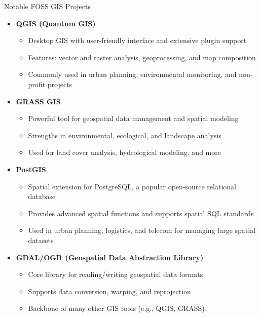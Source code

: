 \documentclass{beamer}
\begin{document}
        \begin{frame}{Notable FOSS GIS Projects}
            \begin{itemize}
                \item \textbf{QGIS (Quantum GIS)}
                    \begin{itemize}
                        \item Desktop GIS with user-friendly interface and extensive plugin support
                        \item Features: vector and raster analysis, geoprocessing, and map composition
                        \item Commonly used in urban planning, environmental monitoring, and non-profit projects
                    \end{itemize}

                \item \textbf{GRASS GIS}
                    \begin{itemize}
                        \item Powerful tool for geospatial data management and spatial modeling
                        \item Strengths in environmental, ecological, and landscape analysis
                        \item Used for land cover analysis, hydrological modeling, and more
                    \end{itemize}
    
                \item \textbf{PostGIS}
                    \begin{itemize}
                        \item Spatial extension for PostgreSQL, a popular open-source relational database
                        \item Provides advanced spatial functions and supports spatial SQL standards
                        \item Used in urban planning, logistics, and telecom for managing large spatial datasets
                    \end{itemize}

                \item \textbf{GDAL/OGR (Geospatial Data Abstraction Library)}
                    \begin{itemize}
                        \item Core library for reading/writing geospatial data formats
                        \item Supports data conversion, warping, and reprojection
                        \item Backbone of many other GIS tools (e.g., QGIS, GRASS)
                    \end{itemize}
                \end{itemize}
            \end{frame}
\end{document}
